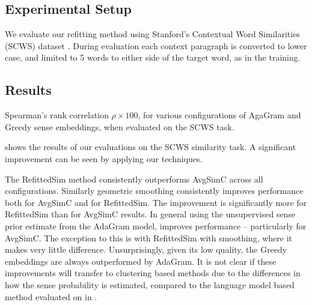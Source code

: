 \documentclass{article} %
\def\parencite{\cite} %
\providecommand{\DIFdelend}{} %
\begin{document}
\DIFdelend \subsection{Experimental Setup}
We evaluate our refitting method using Stanford's Contextual Word Similarities (SCWS) dataset \parencite{Huang2012}.
During evaluation each context paragraph is converted to lower case, and limited to 5 words to either side of the target word, as in the training.


\subsection{Results}

\begin{table}
	\begin{adjustbox}{max width=\columnwidth}
	\end{adjustbox}

\caption{Spearman's rank correlation $\rho \times 100$, for various configurations of AgaGram and Greedy sense embeddings, when evaluated on the SCWS task.} \label{swscres}
\end{table}

 shows the results of our evaluations on the SCWS similarity task. A significant improvement can be seen by applying our techniques.

The RefittedSim method consistently outperforms AvgSimC across all configurations.
Similarly geometric smoothing consistently improves performance both for AvgSimC and for RefittedSim. The improvement is significantly more for RefittedSim than for AvgSimC results.
In general using the unsupervised sense prior estimate from the AdaGram model, improves performance -- particularly for AvgSimC. The exception to this is with RefittedSim with smoothing, where it makes very little difference.
Unsurprisingly, given its low quality, the Greedy embeddings are always outperformed by AdaGram.
It is not clear if these improvements will transfer to clustering based methods due to the differences in how the sense probability is estimated, compared to the language model based method evaluated on in .
\end{document}
